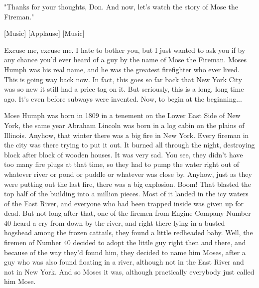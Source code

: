 "Thanks for your thoughts, Don. And now, let's watch the story of Mose the Fireman."

[Music]
[Applause]
[Music]

Excuse me, excuse me. I hate to bother you, but I just wanted to ask you if by any chance you'd ever heard of a guy by the name of Mose the Fireman. Moses Humph was his real name, and he was the greatest firefighter who ever lived. This is going way back now. In fact, this goes so far back that New York City was so new it still had a price tag on it. But seriously, this is a long, long time ago. It's even before subways were invented. Now, to begin at the beginning...

Mose Humph was born in 1809 in a tenement on the Lower East Side of New York, the same year Abraham Lincoln was born in a log cabin on the plains of Illinois. Anyhow, that winter there was a big fire in New York. Every fireman in the city was there trying to put it out. It burned all through the night, destroying block after block of wooden houses. It was very sad. You see, they didn't have too many fire plugs at that time, so they had to pump the water right out of whatever river or pond or puddle or whatever was close by. Anyhow, just as they were putting out the last fire, there was a big explosion. Boom! That blasted the top half of the building into a million pieces. Most of it landed in the icy waters of the East River, and everyone who had been trapped inside was given up for dead. But not long after that, one of the firemen from Engine Company Number 40 heard a cry from down by the river, and right there lying in a busted hogshead among the frozen cattails, they found a little redheaded baby. Well, the firemen of Number 40 decided to adopt the little guy right then and there, and because of the way they'd found him, they decided to name him Moses, after a guy who was also found floating in a river, although not in the East River and not in New York. And so Moses it was, although practically everybody just called him Mose.


